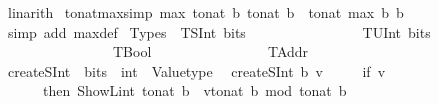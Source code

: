\begin{isabellebody}
\ linarith%
\endisatagproof
{\isafoldproof}%
%
\isadelimproof
%
\endisadelimproof
\isanewline
{}\isamarkupfalse%
\ to{\isacharunderscore}{\kern0pt}nat{\isacharunderscore}{\kern0pt}max{\isacharbrackleft}{\kern0pt}simp{\isacharbrackright}{\kern0pt}{\isacharcolon}{\kern0pt}\ {\isachardoublequoteopen}max\ {\isacharparenleft}{\kern0pt}to{\isacharunderscore}{\kern0pt}nat\ b{}{\isacharparenright}{\kern0pt}\ {\isacharparenleft}{\kern0pt}to{\isacharunderscore}{\kern0pt}nat\ b{}{\isacharparenright}{\kern0pt}\ {\isacharequal}{\kern0pt}\ to{\isacharunderscore}{\kern0pt}nat\ {\isacharparenleft}{\kern0pt}max\ b{}\ b{}{\isacharparenright}{\kern0pt}{\isachardoublequoteclose}%
\isadelimproof
\ %
\endisadelimproof
%
\isatagproof
{}\isamarkupfalse%
\ {\isacharparenleft}{\kern0pt}simp\ add{\isacharcolon}{\kern0pt}\ max{\isacharunderscore}{\kern0pt}def{\isacharparenright}{\kern0pt}%
\endisatagproof
{\isafoldproof}%
%
\isadelimproof
%
\endisadelimproof
\isanewline
\isanewline
{}\isamarkupfalse%
\ Types\ {\isacharequal}{\kern0pt}\ TSInt\ bits\isanewline
\ \ \ \ \ \ \ \ \ \ \ \ \ \ \ {\isacharbar}{\kern0pt}\ TUInt\ bits\isanewline
\ \ \ \ \ \ \ \ \ \ \ \ \ \ \ {\isacharbar}{\kern0pt}\ TBool\isanewline
\ \ \ \ \ \ \ \ \ \ \ \ \ \ \ {\isacharbar}{\kern0pt}\ TAddr\isanewline
\isanewline
\isanewline
{}\isamarkupfalse%
\ createSInt\ {\isacharcolon}{\kern0pt}{\isacharcolon}{\kern0pt}\ {\isachardoublequoteopen}bits\ {\isasymRightarrow}\ int\ {\isasymRightarrow}\ Valuetype{\isachardoublequoteclose}\isanewline
{}\isanewline
\ \ {\isachardoublequoteopen}createSInt\ b\ v\ {\isacharequal}{\kern0pt}\isanewline
\ \ \ \ {\isacharparenleft}{\kern0pt}if\ v\ {\isasymge}\ {}\isanewline
\isanewline
\ \ \ \ \ \ then\ ShowL\isactrlsub i\isactrlsub n\isactrlsub t\ {\isacharparenleft}{\kern0pt}{\isacharminus}{\kern0pt}{\isacharparenleft}{\kern0pt}{}{\isacharcircum}{\kern0pt}{\isacharparenleft}{\kern0pt}{\isacharparenleft}{\kern0pt}to{\isacharunderscore}{\kern0pt}nat\ b{\isacharparenright}{\kern0pt}{\isacharminus}{\kern0pt}{}{\isacharparenright}{\kern0pt}{\isacharparenright}{\kern0pt}\ {\isacharplus}{\kern0pt}\ {\isacharparenleft}{\kern0pt}v{\isacharplus}{\kern0pt}{}{\isacharcircum}{\kern0pt}{\isacharparenleft}{\kern0pt}{\isacharparenleft}{\kern0pt}to{\isacharunderscore}{\kern0pt}nat\ b{\isacharparenright}{\kern0pt}{\isacharminus}{\kern0pt}{}{\isacharparenright}{\kern0pt}{\isacharparenright}{\kern0pt}\ mod\ {\isacharparenleft}{\kern0pt}{}{\isacharcircum}{\kern0pt}{\isacharparenleft}{\kern0pt}to{\isacharunderscore}{\kern0pt}nat\ b{\isacharparenright}{\kern0pt}{\isacharparenright}{\kern0pt}{\isacharparenright}{\kern0pt}\isanewline

\end{isabellebody}
